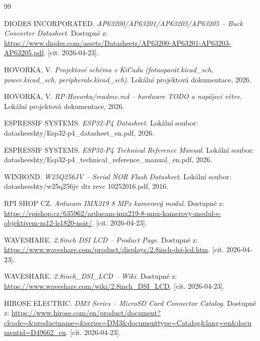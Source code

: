 \documentclass[12pt, a4paper, oneside]{report}
\begin{document}
\begin{thebibliography}{99}


 DIODES INCORPORATED. \textit{AP63200/AP63201/AP63203/AP63205 -- Buck Converter Datasheet}. Dostupné z: \url{https://www.diodes.com/assets/Datasheets/AP63200-AP63201-AP63203-AP63205.pdf}. [cit. 2026-04-23].

 HOVORKA, V. \textit{Projektové schéma v KiCadu (fotaoparát.kicad\_sch, power.kicad\_sch, peripherals.kicad\_sch)}. Lokální projektová dokumentace, 2026.

 HOVORKA, V. \textit{RP-Hovorka/readme.md -- hardware TODO a napájecí větve}. Lokální projektová dokumentace, 2026.

 ESPRESSIF SYSTEMS. \textit{ESP32-P4 Datasheet}. Lokální soubor: datasheeshty/Esp32-p4\_datasheet\_en.pdf, 2026.

 ESPRESSIF SYSTEMS. \textit{ESP32-P4 Technical Reference Manual}. Lokální soubor: datasheeshty/Esp32-p4\_technical\_reference\_manual\_en.pdf, 2026.

 WINBOND. \textit{W25Q256JV -- Serial NOR Flash Datasheet}. Lokální soubor: datasheeshty/w25q256jv dtr revc 10252016.pdf, 2016.

 RPI SHOP CZ. \textit{Arducam IMX219 8 MPx kamerový modul}. Dostupné z: \url{https://rpishop.cz/635962/arducam-imx219-8-mpx-kamerovy-modul-s-objektivem-m12-ls1820-noir/}. [cit. 2026-04-23].

 WAVESHARE. \textit{2.8inch DSI LCD -- Product Page}. Dostupné z: \url{https://www.waveshare.com/product/displays/2.8inch-dsi-lcd.htm}. [cit. 2026-04-23].

 WAVESHARE. \textit{2.8inch\_DSI\_LCD -- Wiki}. Dostupné z: \url{https://www.waveshare.com/wiki/2.8inch_DSI_LCD}. [cit. 2026-04-23].

 HIROSE ELECTRIC. \textit{DM3 Series -- MicroSD Card Connector Catalog}. Dostupné z: \url{https://www.hirose.com/en/product/document?clcode=&productname=&series=DM3&documenttype=Catalog&lang=en&documentid=D49662_en}. [cit. 2026-04-23].


\end{thebibliography}
\end{document}
